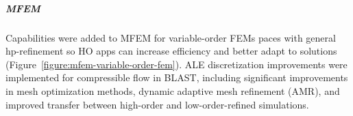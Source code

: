 \subparagraph{MFEM}
Capabilities were added to MFEM for variable-order FEMs paces with general hp-refinement so HO apps can increase efficiency and better adapt to solutions (Figure~\ref{figure:mfem-variable-order-fem}).
ALE discretization improvements were implemented for compressible flow in BLAST, including significant improvements in mesh optimization methods, dynamic adaptive mesh refinement (AMR), and improved transfer between high-order and low-order-refined simulations.


